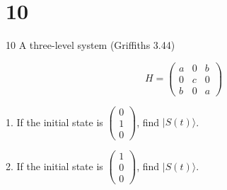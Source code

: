 \documentclass{article}
\begin{document}
\newpage

\section*{10}
\begin{ques}\label{q10}
10 A three-level system (Griffiths 3.44)

\[
H = \begin{pmatrix} a & 0 & b \\ 0 & c & 0 \\ b & 0 & a \end{pmatrix}
\]

1. If the initial state is $\begin{pmatrix} 0 \\ 1 \\ 0\end{pmatrix}$, find $|S(t)\rangle$.

2. If the initial state is $\begin{pmatrix} 1 \\ 0 \\ 0\end{pmatrix}$, find $|S(t)\rangle$.
\end{ques}
\end{document}
